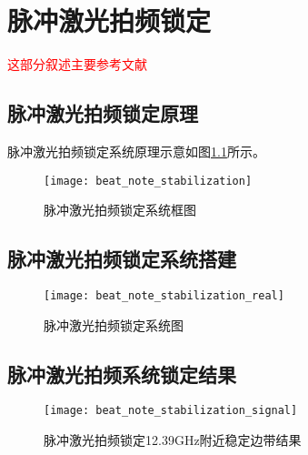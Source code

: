 
\chapter[脉冲激光拍频锁定]{脉冲激光拍频锁定}

\textcolor{red}{这部分叙述主要参考文献\cite[]{Islam_Campbell_Choi_Clark_Conover_Debnath_Edwards_Fields_Hayes_Hucul_et_al_2014}}

\section[脉冲激光拍频锁定原理]{脉冲激光拍频锁定原理}
脉冲激光拍频锁定系统原理示意如图\ref{fig:beat_note_stabilization}所示。

\begin{figure}
    \centering
    \caption[脉冲激光拍频锁定系统框图]{脉冲激光拍频锁定系统框图\label{fig:beat_note_stabilization}}
    \texttt{[image: beat\_note\_stabilization]}
\end{figure}

\section[脉冲激光拍频锁定系统搭建]{脉冲激光拍频锁定系统搭建}
\begin{figure}
    \centering
    \caption[脉冲激光拍频锁定系统图]{脉冲激光拍频锁定系统图\label{fig:beat_note_stabilization_real}}
    \texttt{[image: beat\_note\_stabilization\_real]}
\end{figure}
\section[脉冲激光拍频系统锁定结果]{脉冲激光拍频系统锁定结果}

\begin{figure}
    \centering
    \caption[脉冲激光拍频锁定12.39GHz附近稳定边带结果]{脉冲激光拍频锁定12.39GHz附近稳定边带结果\label{fig:beat_note_stabilization_signal}}
    \texttt{[image: beat\_note\_stabilization\_signal]}
\end{figure}
